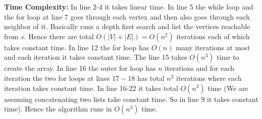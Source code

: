 \documentclass[a4paper, 11pt]{article}
\begin{document}
{\begin{algorithm}[H]
{
}
\caption{$(A,s,W)$}
\end{algorithm}\parinf

\textbf{Time Complexity:} In line 2-4 it takes linear time. In line 5 the while loop and the for loop at line 7 goes through each vertex and then also goes through each neighbor of it. Basically runs a depth first search and list the vertices reachable from $s$. Hence there are total $O(|V|+|E|)=O(n^2)$ iterations each of which takes constant time. In line 12 the for loop has $O(n)$ many iterations at most and each iteration it takes constant time. The line 15 takes $O(n^3)$ time to create the array. In line 16 the outer for loop has $n$ iterations and for each iteration the two for loops at lines $17-18$  has total $n^2$ iterations where each iteration takes constant time. In line 16-22 it takes total  $O(n^3)$ time (We are assuming concatenating two lists take constant time. So in line 9 it takes constant time).  Hence the algorithm runs in $O(n^3)$ time. 
}


\end{document}
